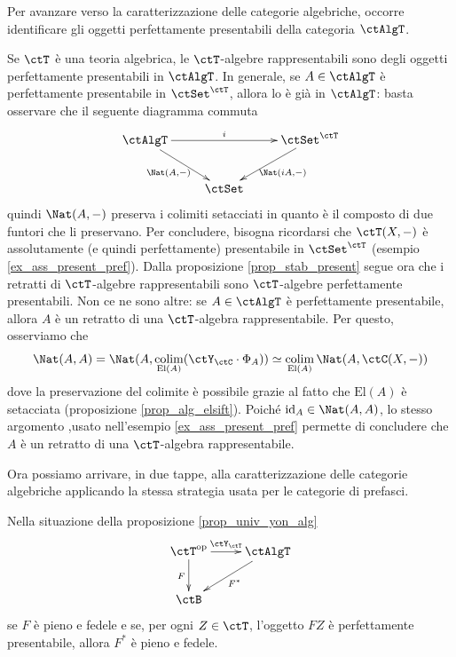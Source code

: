 Per avanzare verso la caratterizzazione delle categorie algebriche, occorre identificare gli oggetti perfettamente
presentabili della categoria \(\ctAlgT\).

\begin{example}\label{ex_present_alg}
 Se \(\ctT\) è una teoria algebrica, le \(\ctT\)-algebre rappresentabili sono degli oggetti perfettamente presentabili
 in \(\ctAlgT\). In generale, se \(A \in \ctAlgT\) è perfettamente presentabile in \(\ctSet^{\ctT}\), allora lo è già
 in \(\ctAlgT\): basta osservare che il seguente diagramma commuta
 \[\xymatrix{\ctAlgT \ar[rr]^-{i} \ar[rd]_{\Nat(A,-)} & & \ctSet^{\ctT} \ar[ld]^{\Nat(iA,-)} \\
  & \ctSet}\]
 quindi \(\Nat(A,-)\) preserva i colimiti setacciati in quanto è il composto di due funtori che li preservano.
 Per concludere, bisogna ricordarsi che \(\ctT(X,-)\) è assolutamente (e quindi perfettamente) presentabile in
 \(\ctSet^{\ctT}\) (esempio \ref{ex_ass_present_pref}). Dalla proposizione \ref{prop_stab_present} segue ora che
 i retratti di \(\ctT\)-algebre rappresentabili sono \(\ctT\)-algebre perfettamente presentabili. Non ce ne sono altre:
 se \(A \in \ctAlgT\) è perfettamente presentabile, allora \(A\) è un retratto di una \(\ctT\)-algebra rappresentabile.
 Per questo, osserviamo che
 \[ \Nat(A,A) = \Nat(A, \colim_{\mathrm{El}(A)}(\ctY_{\ctC} \cmp \Phi_A)) \simeq \colim_{\mathrm{El}(A)} \Nat(A, \ctC(X,-)) \]
 dove la preservazione del colimite è possibile grazie al fatto che \(\mathrm{El}(A)\) è setacciata (proposizione
 \ref{prop_alg_elsift}). Poiché \(\id_A \in \Nat(A,A)\), lo stesso argomento ,usato nell'esempio \ref{ex_ass_present_pref}
 permette di concludere che \(A\) è un retratto di una \(\ctT\)-algebra rappresentabile.
\end{example}

Ora possiamo arrivare, in due tappe, alla caratterizzazione delle categorie algebriche applicando la stessa strategia usata
per le categorie di prefasci.

\begin{lemma}\label{lemma_caratt_alg}
 Nella situazione della proposizione \ref{prop_univ_yon_alg}
 \[\xymatrix{\ctT^{\op} \ar[r]^-{\ctY_{\ctT}} \ar[d]_{F} & \ctAlgT \ar[ld]^{F^*} \\
  \ctB}\]
 se \(F\) è pieno e fedele e se, per ogni \(Z \in \ctT\), l'oggetto \(FZ\) è perfettamente presentabile, allora \(F^*\) è pieno e fedele.
\end{lemma}

